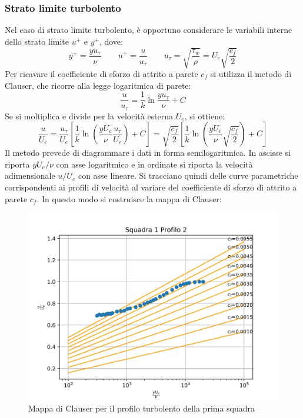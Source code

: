 \subsubsection{Strato limite turbolento}
Nel caso di strato limite turbolento, è opportuno considerare le variabili interne dello strato limite $u^+$ e $y^+$, dove:
\begin{equation*}
    y^+ = \frac{y u_\tau}{\nu} \qquad u^+ = \frac{u}{u_\tau} \qquad u_\tau = \sqrt{\frac{\tau_w}{\rho}} = U_e \sqrt{\frac{c_f}2}
\end{equation*}
Per ricavare il coefficiente di sforzo di attrito a parete $c_f$ si utilizza il metodo di Clauser, che ricorre alla legge logaritmica di parete:
\begin{equation*}
    \frac{u}{u_\tau} = \frac 1k \ln \frac{y u_\tau}{\nu} + C
\end{equation*}
Se si moltiplica e divide per la velocità esterna $U_e$, si ottiene:
\begin{equation*}
    \frac{u}{U_e} = \frac{u_\tau}{U_e}\left[ \frac 1k \ln\left( \frac{yU_e}{\nu}\frac{u_\tau}{U_e} \right) +C\right] = \sqrt{\frac{c_f}2}\left[ \frac 1k \ln\left( \frac{yU_e}{\nu}\sqrt{\frac{c_f}2} \right) +C\right]
\end{equation*}
Il metodo prevede di diagrammare i dati in forma semilogaritmica. In ascisse si riporta $yU_e/\nu$ con asse logaritmico e in ordinate si riporta la velocità adimensionale $u/U_e$ con asse lineare. Si tracciano quindi delle curve parametriche corrispondenti ai profili di velocità al variare del coefficiente di sforzo di attrito a parete $c_f$.
\newpage
\noindent In questo modo si costruisce la mappa di Clauser:
\begin{figure}[H]
    \centering
    \includegraphics[width=.8\textwidth]{images/9/sq1p2clauser.png}
    \caption{Mappa di Clauser per il profilo turbolento della prima squadra}
\end{figure}

